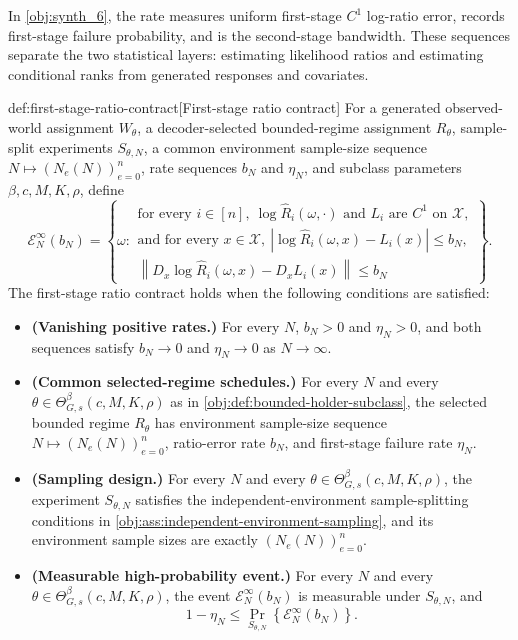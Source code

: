 In \cref{obj:synth_6}, the rate  measures uniform first-stage \(C^1\) log-ratio error,  records first-stage failure probability, and  is the second-stage bandwidth. These sequences separate the two statistical layers: estimating likelihood ratios and estimating conditional ranks from generated responses and covariates.

\begin{definitionv}{def:first-stage-ratio-contract}[First-stage ratio contract]
For a generated observed-world assignment \(W_\theta\), a decoder-selected bounded-regime assignment \(R_\theta\), sample-split experiments \(S_{\theta,N}\), a common environment sample-size sequence \(N\mapsto (N_e(N))_{e=0}^n\), rate sequences \(b_N\) and \(\eta_N\), and subclass parameters \(\beta,c,M,K,\rho\), define
\[
\mathcal E_N^{\infty}(b_N)
=
\left\{
\omega:
\begin{array}{l}
\text{for every } i\in[n],\ 
\log \widehat R_i(\omega,\cdot)\text{ and }L_i\text{ are }C^1\text{ on }\mathcal X,\\
\text{and for every }x\in\mathcal X,\ 
\left|\log \widehat R_i(\omega,x)-L_i(x)\right|\le b_N,\\
\left\|D_x\log \widehat R_i(\omega,x)-D_xL_i(x)\right\|\le b_N
\end{array}
\right\}.
\]
The first-stage ratio contract holds when the following conditions are satisfied:
\begin{itemize}
\item \textbf{(Vanishing positive rates.)} For every \(N\), \(b_N>0\) and \(\eta_N>0\), and both sequences satisfy \(b_N\to0\) and \(\eta_N\to0\) as \(N\to\infty\).
\item \textbf{(Common selected-regime schedules.)} For every \(N\) and every \(\theta\in\Theta^{\beta}_{G,s}(c,M,K,\rho)\) as in \cref{obj:def:bounded-holder-subclass}, the selected bounded regime \(R_\theta\) has environment sample-size sequence \(N\mapsto (N_e(N))_{e=0}^n\), ratio-error rate \(b_N\), and first-stage failure rate \(\eta_N\).
\item \textbf{(Sampling design.)} For every \(N\) and every \(\theta\in\Theta^{\beta}_{G,s}(c,M,K,\rho)\), the experiment \(S_{\theta,N}\) satisfies the independent-environment sample-splitting conditions in \cref{obj:ass:independent-environment-sampling}, and its environment sample sizes are exactly \((N_e(N))_{e=0}^n\).
\item \textbf{(Measurable high-probability event.)} For every \(N\) and every \(\theta\in\Theta^{\beta}_{G,s}(c,M,K,\rho)\), the event \(\mathcal E_N^{\infty}(b_N)\) is measurable under \(S_{\theta,N}\), and
\[
1-\eta_N
\le
\Pr_{S_{\theta,N}}\left\{\mathcal E_N^{\infty}(b_N)\right\}.
\]
\end{itemize}
\end{definitionv}

